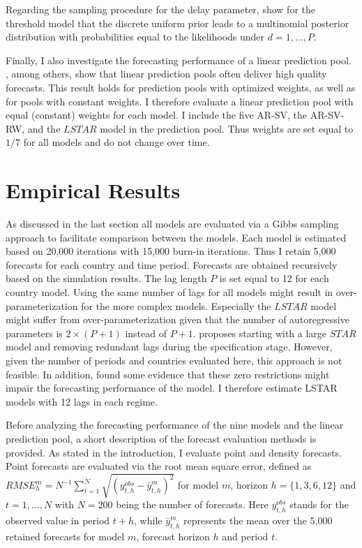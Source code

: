 \documentclass[12pt,letterpaper,fleqn]{article}           %
\begin{document}
Regarding the sampling procedure for the delay parameter, \textcite{chen95} show for the threshold model that the discrete uniform prior leads to a multinomial posterior distribution with probabilities equal to the likelihoods under $d = 1,\ldots,P$. 

Finally, I also investigate the forecasting performance of a linear prediction pool. \textcite{gew11}, among others, show that linear prediction pools often deliver high quality forecasts. This result holds for prediction pools with optimized weights, as well as for pools with constant weights. I therefore evaluate a linear prediction pool with equal (constant) weights for each model. I include the five AR-SV, the AR-SV-RW, and the $LSTAR$ model in the prediction pool.  Thus weights are set equal to $1/7$ for all models and do not change over time.

\section{Empirical Results}
\label{sec:results}

As discussed in the last section all models are evaluated via a Gibbs sampling approach to facilitate comparison between the models. Each model is estimated based on 20,000 iterations with 15,000 burn-in iterations. Thus I retain 5,000 forecasts for each country and time period. Forecasts are obtained recursively based on the simulation results. The lag length $P$ is set equal to 12 for each country model. Using the same number of lags for all models might result in over-parameterization for the more complex models. Especially the $LSTAR$ model might suffer from over-parameterization given that the number of autoregressive parameters is $2 \times (P + 1)$ instead of $P + 1$. \textcite{ter94} proposes starting with a large $STAR$ model and removing redundant lags during the specification stage. However, given the number of periods and countries evaluated here, this approach is not feasible. In addition, \textcite{ter05} found some evidence that these zero restrictions might impair the forecasting performance of the model. I therefore estimate LSTAR models with 12 lags in each regime.

Before analyzing the forecasting performance of the nine models and the linear prediction pool, a short description of the forecast evaluation methods is provided. As stated in the introduction, I evaluate point and density forecasts. Point forecasts are evaluated via the root mean square error, defined as $RMSE^m_h = N^{-1} \sum_{t=1}^N \sqrt{(y_{t,h}^{obs} - \bar{y}_{t,h}^m)^2}$ for model $m$, horizon $h = \{1, 3, 6, 12\}$ and $t = 1,\ldots,N$ with $N = 200$ being the number of forecasts. Here $y_{t,h}^{obs}$ stands for the observed value in period $t+h$, while $\bar{y}_{t,h}^m$ represents the mean over the 5,000 retained forecasts for model $m$, forecast horizon $h$ and period $t$.
\end{document}
